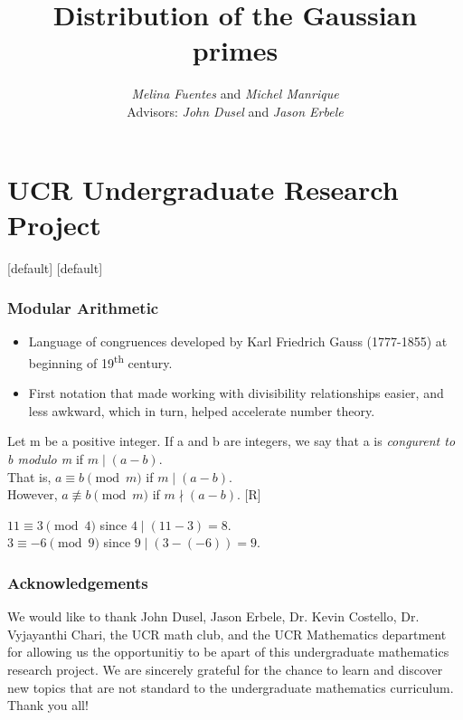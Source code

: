 \documentclass{beamer}
\begin{document}
	\section{UCR Undergraduate Research Project} 
	\title{Distribution of the Gaussian primes}
	\author{{\it Melina Fuentes} and {\it Michel Manrique}\hspace{8ex} \\
	\footnotesize Advisors: {\it John Dusel} and {\it Jason Erbele} }
	\maketitle

	[default]
	[default]

	\begin{frame}
		\frametitle{Modular Arithmetic}
		\pause	
		\begin{itemize}
			\item 	Language of congruences developed by Karl Friedrich Gauss (1777-1855) 
				at beginning of 19\textsuperscript{th} century.
			\item   First notation that made working with divisibility relationships easier, and less awkward, 
				which in turn, helped accelerate number theory.
		\end{itemize}
		\pause
		\begin{definition}
			Let m be a positive integer. If a and b are integers, we say that 
			a is \textit{congurent to b modulo m} if $m \mid (a-b)$.
			\\ \hspace{4ex} That is, $a \equiv b \pmod m$  if $m \mid (a-b)$.
			\\ \hspace{4ex} However, $a \not\equiv b \pmod m$ if  $m \nmid (a-b)$. [R]
		\end{definition}
		\pause
		\begin{example}
			$11 \equiv 3 \pmod 4$ since $4 \mid (11-3) = 8$.
			\\ $3 \equiv -6 \pmod 9$ since $9 \mid (3-(-6))=9$.
		\end{example}
	\end{frame}

	\begin{frame}
		\frametitle{Acknowledgements}
		\pause
		\hspace{4ex} 
		We would like to thank John Dusel, Jason Erbele, Dr. Kevin Costello, Dr. Vyjayanthi Chari, the UCR math club, 
		and the UCR Mathematics department for allowing us the opportunitiy to be apart of this undergraduate mathematics
		research project. We are sincerely grateful for the chance to learn and discover new topics that are not standard to the 
		undergraduate mathematics curriculum. Thank you all!
	\end{frame}
\end{document}
